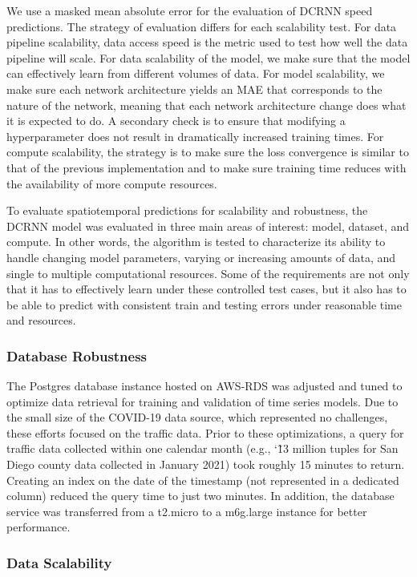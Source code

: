 \documentclass{article}
\begin{document}
We use a masked mean absolute error for the evaluation of DCRNN speed predictions. The strategy of evaluation differs for each scalability test. For data pipeline scalability, data access speed is the metric used to test how well the data pipeline will scale. For data scalability of the model, we make sure that the model can effectively learn from different volumes of data. For model scalability, we make sure each network architecture yields an MAE that corresponds to the nature of the network, meaning that each network architecture change does what it is expected to do. A secondary check is to ensure that modifying a hyperparameter does not result in dramatically increased training times. For compute scalability, the strategy is to make sure the loss convergence is similar to that of the previous implementation and to make sure training time reduces with the availability of more compute resources.

To evaluate spatiotemporal predictions for scalability and robustness, the DCRNN model was evaluated in three main areas of interest: model, dataset, and compute. In other words, the algorithm is tested to characterize its ability to handle changing model parameters, varying or increasing amounts of data, and single to multiple computational resources. Some of the requirements are not only that it has to effectively learn under these controlled test cases, but it also has to be able to predict with consistent train and testing errors under reasonable time and resources.

\subsubsection{Database Robustness}

The Postgres database instance hosted on AWS-RDS was adjusted and tuned to optimize data retrieval for training and validation of time series models. Due to the small size of the COVID-19 data source, which represented no challenges, these efforts focused on the traffic data. Prior to these optimizations, a query for traffic data collected within one calendar month (e.g., \char`\~13 million tuples for San Diego county data collected in January 2021) took roughly 15 minutes to return. Creating an index on the date of the timestamp (not represented in a dedicated column) reduced the query time to just two minutes. In addition, the database service was transferred from a t2.micro to a m6g.large instance for better performance.

\subsubsection{Data Scalability}
\end{document}

